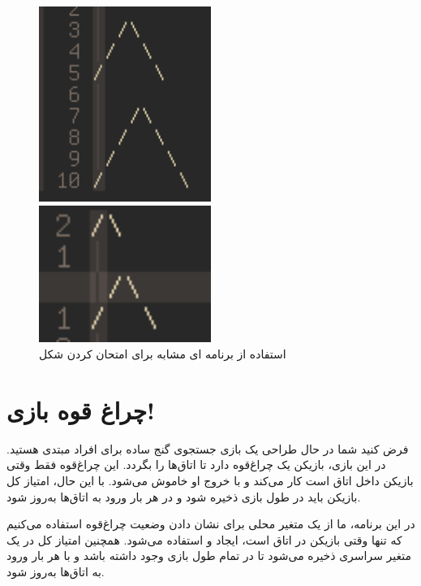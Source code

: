 \documentclass{article}
\begin{document}
\begin{figure}[h!]
    \begin{minipage}{0.4\textwidth}
        \centering
        \includegraphics[width=0.5\textwidth]{q1-small.png}
    \end{minipage}
    \begin{minipage}{0.4\textwidth}
        \centering
        \includegraphics[width=0.5\textwidth]{q1-big.png}
    \end{minipage}
    \caption{استفاده از برنامه ای مشابه  برای امتحان کردن شکل }
\end{figure}

\newpage

\section{چراغ قوه بازی!}
فرض کنید شما در حال طراحی یک بازی جستجوی گنج ساده برای افراد مبتدی هستید. در این بازی، بازیکن یک چراغ‌قوه دارد تا اتاق‌ها را بگردد. این چراغ‌قوه فقط وقتی بازیکن داخل اتاق است کار می‌کند و با خروج او خاموش می‌شود. با این حال، امتیاز کل بازیکن باید در طول بازی ذخیره شود و در هر بار ورود به اتاق‌ها به‌روز شود.

در این برنامه، ما از یک متغیر محلی برای نشان دادن وضعیت چراغ‌قوه استفاده می‌کنیم که تنها وقتی بازیکن در اتاق است، ایجاد و استفاده می‌شود. همچنین امتیاز کل در یک متغیر سراسری ذخیره می‌شود تا در تمام طول بازی وجود داشته باشد و با هر بار ورود به اتاق‌ها به‌روز شود.
\end{document}
